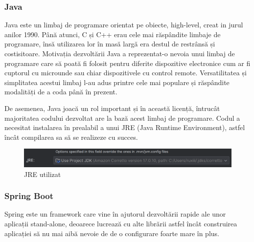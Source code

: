 \begin{minipage}{\textwidth}
\hfill
\begin{minipage}{0.9\textwidth}
\subsubsection{Java}
\end{minipage}
\end{minipage}

\hspace{0cm} Java este un limbaj de programare orientat pe obiecte, high-level, creat in jurul anilor 1990. Până atunci, C și C++ erau cele mai răspândite limbaje de programare, însă utilizarea lor în masă largă era destul de restrânsă și costisitoare. Motivația dezvoltării Java a reprezentat-o nevoia unui limbaj de programare care să poată fi folosit pentru diferite dispozitive electronice cum ar fi cuptorul cu microunde sau chiar dispozitivele cu control remote.\cite{citation3} Versatilitatea și simplitatea acestui limbaj l-au adus printre cele mai populare și răspândite modalități de a coda până în prezent. 

De asemenea, Java joacă un rol important și în această licență, întrucât majoritatea codului dezvoltat are la bază acest limbaj de programare. Codul a necesitat instalarea în prealabil a unui JRE (Java Runtime Environment), astfel încât compilarea sa să se realizeze cu succes.

\begin{figure}[!htb]
    \centering
    \includegraphics[width=0.9\linewidth]{images/JRE.png}
    \caption{JRE utilizat}
    \label{fig:JRE}
\end{figure}

\vspace{0.5em}
    
\begin{minipage}{\textwidth}
\hfill
\begin{minipage}{0.9\textwidth}
\subsubsection{Spring Boot}
\end{minipage}
\end{minipage}

\hspace{0cm}Spring este un framework care vine în ajutorul dezvoltării rapide ale unor aplicații stand-alone, deoarece lucrează cu alte librării astfel încât construirea aplicației să nu mai aibă nevoie de de o configurare foarte mare în plus.\cite{citation4}

